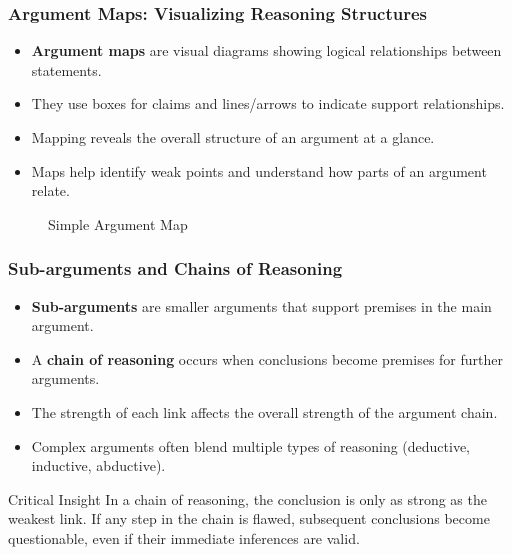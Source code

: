 \documentclass{beamer}
\begin{document}
\begin{frame}
    \frametitle{Argument Maps: Visualizing Reasoning Structures}
    \begin{itemize}
        \item \textbf{Argument maps} are visual diagrams showing logical relationships between statements.
        \item They use boxes for claims and lines/arrows to indicate support relationships.
        \item Mapping reveals the overall structure of an argument at a glance.
        \item Maps help identify weak points and understand how parts of an argument relate.
    \end{itemize}
    
    \begin{figure}
        \centering
        \caption{Simple Argument Map}
    \end{figure}
\end{frame}

\begin{frame}
    \frametitle{Sub-arguments and Chains of Reasoning}
    \begin{itemize}
        \item \textbf{Sub-arguments} are smaller arguments that support premises in the main argument.
        \item A \textbf{chain of reasoning} occurs when conclusions become premises for further arguments.
        \item The strength of each link affects the overall strength of the argument chain.
        \item Complex arguments often blend multiple types of reasoning (deductive, inductive, abductive).
    \end{itemize}
    
    \begin{alertblock}{Critical Insight}
        In a chain of reasoning, the conclusion is only as strong as the weakest link. If any step in the chain is flawed, subsequent conclusions become questionable, even if their immediate inferences are valid.
    \end{alertblock}
\end{frame}
\end{document}
